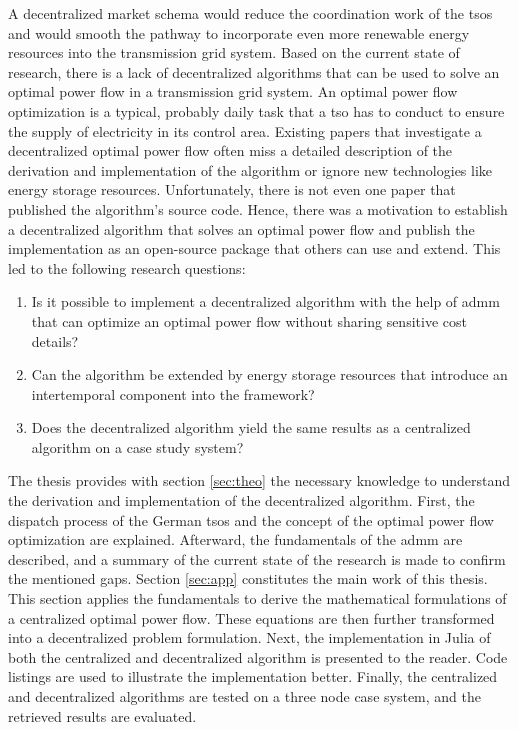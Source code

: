 A decentralized market schema would reduce the coordination work of the \glspl{tso} and would smooth the pathway to incorporate even more renewable energy resources into the transmission grid system. Based on the current state of research, there is a lack of decentralized algorithms that can be used to solve an optimal power flow in a transmission grid system. An optimal power flow optimization is a typical, probably daily task that a \gls{tso} has to conduct to ensure the supply of electricity in its control area. Existing papers that investigate a decentralized optimal power flow often miss a detailed description of the derivation and implementation of the algorithm or ignore new technologies like energy storage resources. Unfortunately, there is not even one paper that published the algorithm's source code. Hence, there was a motivation to establish a decentralized algorithm that solves an optimal power flow and publish the implementation as an open-source package that others can use and extend. This led to the following research questions:

\begin{enumerate}
	\item Is it possible to implement a decentralized algorithm with the help of \gls{admm} that can optimize an optimal power flow without sharing sensitive cost details?
	\item Can the algorithm be extended by energy storage resources that introduce an intertemporal component into the framework?
	\item Does the decentralized algorithm yield the same results as a centralized algorithm on a case study system?
\end{enumerate}

The thesis provides with section \ref{sec:theo} the necessary knowledge to understand the derivation and implementation of the decentralized algorithm. First, the dispatch process of the German \glspl{tso} and the concept of the optimal power flow optimization are explained. Afterward, the fundamentals of the \gls{admm} are described, and a summary of the current state of the research is made to confirm the mentioned gaps. Section \ref{sec:app} constitutes the main work of this thesis. This section applies the fundamentals to derive the mathematical formulations of a centralized optimal power flow. These equations are then further transformed into a decentralized problem formulation. Next, the implementation in Julia of both the centralized and decentralized algorithm is presented to the reader. Code listings are used to illustrate the implementation better. Finally, the centralized and decentralized algorithms are tested on a three node case system, and the retrieved results are evaluated.



